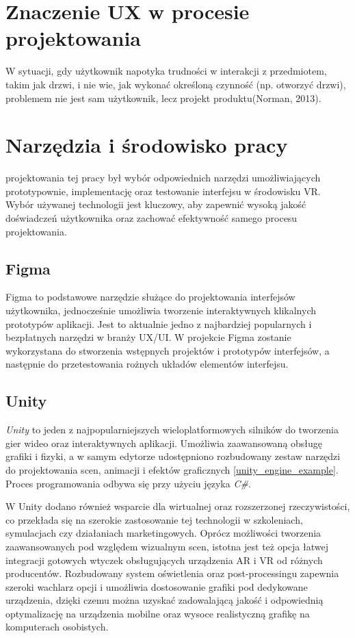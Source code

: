  \section{Znaczenie UX w procesie projektowania}
 
 W sytuacji, gdy użytkownik napotyka trudności w interakcji z przedmiotem, takim jak drzwi, i nie wie, jak wykonać określoną czynność (np. otworzyć drzwi), problemem nie jest sam użytkownik, lecz projekt produktu(Norman, 2013).



\section {Narzędzia i środowisko pracy}


 projektowania tej pracy był wybór odpowiednich narzędzi umożliwiających prototypownie, implementację oraz testowanie interfejsu w środowisku VR. Wybór używanej technologii jest kluczowy, aby zapewnić wysoką jakość doświadczeń użytkownika oraz zachować efektywność samego procesu projektowania.

\subsection{Figma}
Figma to podstawowe narzędzie służące do projektowania interfejsów użytkownika, jednocześnie umożliwia tworzenie interaktywnych klikalnych prototypów aplikacji. Jest to aktualnie jedno z najbardziej popularnych i bezpłatnych narzędzi w branży UX/UI. W projekcie Figma zostanie wykorzystana do stworzenia wstępnych projektów i prototypów interfejsów, a następnie do przetestowania rożnych układów elementów interfejsu. 
\subsection{Unity}
\textit{Unity} to jeden z najpopularniejszych wieloplatformowych silników do tworzenia gier wideo oraz interaktywnych aplikacji. Umożliwia zaawansowaną obsługę grafiki i fizyki, a w samym edytorze udostępniono rozbudowany zestaw narzędzi do projektowania scen, animacji i efektów graficznych \ref{unity_engine_example}. Proces programowania odbywa się przy użyciu języka \textit{C\#}.

W Unity dodano również wsparcie dla wirtualnej oraz rozszerzonej rzeczywistości, co przekłada się na szerokie zastosowanie tej technologii w szkoleniach, symulacjach czy działaniach marketingowych. Oprócz możliwości tworzenia zaawansowanych pod względem wizualnym scen, istotna jest też opcja łatwej integracji gotowych wtyczek obsługujących urządzenia AR i VR od różnych producentów. Rozbudowany system oświetlenia oraz post-processingu zapewnia szeroki wachlarz opcji i umożliwia dostosowanie grafiki pod dedykowane urządzenia, dzięki czemu można uzyskać zadowalającą jakość i odpowiednią optymalizację na urządzenia mobilne oraz wysoce realistyczną grafikę na komputerach osobistych.

